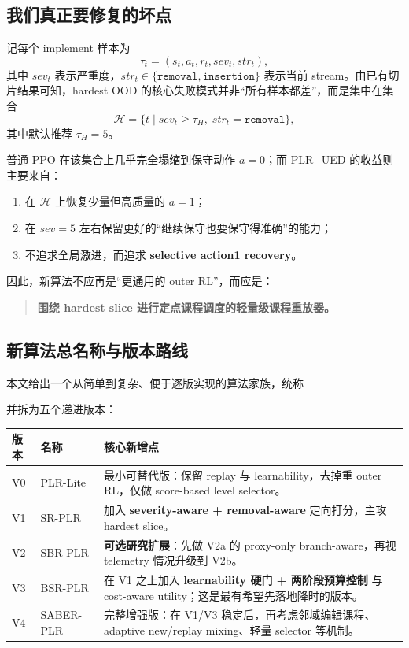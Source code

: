 \documentclass[11pt,a4paper]{ctexart}
\begin{document}
\subsection{我们真正要修复的坏点}
记每个 implement 样本为
\[
\tau_t=(s_t, a_t, r_t, sev_t, str_t),
\]
其中 \(sev_t\) 表示严重度，\(str_t\in\{\texttt{removal},\texttt{insertion}\}\) 表示当前 stream。由已有切片结果可知，hardest OOD 的核心失败模式并非“所有样本都差”，而是集中在集合
\[
\mathcal{H}=\{t\mid sev_t\ge \tau_H,\; str_t=\texttt{removal}\},
\]
其中默认推荐 \(\tau_H=5\)。

普通 PPO 在该集合上几乎完全塌缩到保守动作 \(a=0\)；而 PLR\_UED 的收益则主要来自：
\begin{enumerate}[leftmargin=2.2em,itemsep=0.25em]
    \item 在 \(\mathcal{H}\) 上恢复少量但高质量的 \(a=1\)；
    \item 在 \(sev=5\) 左右保留更好的“继续保守也要保守得准确”的能力；
    \item 不追求全局激进，而追求 \textbf{selective action1 recovery}。
\end{enumerate}

因此，新算法不应再是“更通用的 outer RL”，而应是：
\begin{quote}
\textbf{围绕 hardest slice 进行定点课程调度的轻量级课程重放器。}
\end{quote}

\subsection{新算法总名称与版本路线}
本文给出一个从简单到复杂、便于逐版实现的算法家族，统称
\begin{center}
\end{center}
并拆为五个递进版本：
\begin{center}
\begin{tabular}{p{2.1cm}p{3.0cm}p{8.6cm}}
\toprule
版本 & 名称 & 核心新增点 \\
\midrule
V0 & PLR-Lite & 最小可替代版：保留 replay 与 learnability，去掉重 outer RL，仅做 score-based level selector。 \\
V1 & SR-PLR & 加入 \textbf{severity-aware + removal-aware} 定向打分，主攻 hardest slice。 \\
V2 & SBR-PLR & \textbf{可选研究扩展}：先做 V2a 的 proxy-only branch-aware，再视 telemetry 情况升级到 V2b。 \\
V3 & BSR-PLR & 在 V1 之上加入 \textbf{learnability 硬门 + 两阶段预算控制} 与 cost-aware utility；这是最有希望先落地降时的版本。 \\
V4 & SABER-PLR & 完整增强版：在 V1/V3 稳定后，再考虑邻域编辑课程、adaptive new/replay mixing、轻量 selector 等机制。 \\
\bottomrule
\end{tabular}
\end{center}
\end{document}
